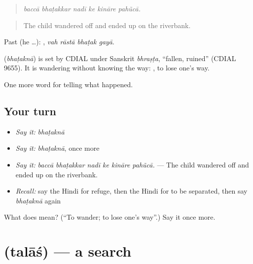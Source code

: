 \begin{quote}
     
\end{quote}

\begin{quote}
\emph{baccā bhaṭakkar nadī ke kināre pahũcā.}
\end{quote}

\begin{quote}
The child wandered off and ended up on the riverbank.
\end{quote}

Past (he …):    , \emph{vah rāstā bhaṭak gayā}.

\begin{cousinweb}
\textbf{} (\emph{bhaṭaknā}) is set by CDIAL under Sanskrit \emph{bhraṣṭa}, \textquotedblleft{}fallen, ruined\textquotedblright{} (CDIAL 9655). It is wandering without knowing the way: \textbf{ }, to lose one's way.
\end{cousinweb}

\begin{grammarlens}[title={What you've built}]
One more word for telling what happened.
\end{grammarlens}

\subsection*{Your turn}
\begin{itemize}
\raggedright
  \item \emph{Say it:} \emph{bhaṭaknā}
  \item \emph{Say it:} \emph{bhaṭaknā}, once more
  \item \emph{Say it:} \emph{baccā bhaṭakkar nadī ke kināre pahũcā.} — The child wandered off and ended up on the riverbank.
  \item \emph{Recall:} say the Hindi for refuge, then the Hindi for to be separated, then say \emph{bhaṭaknā} again
\end{itemize}

\begin{tcolorbox}[breakable,colback=teal!4,colframe=teal!35!black,title={Before you move on}]
What does  mean? (\textquotedblleft{}To wander; to lose one's way\textquotedblright{}.) Say it once more.
\end{tcolorbox}
\section[\texorpdfstring{\hi{तलाश} (talāś)}{तलाश (talāś)}]{ (talāś) — a search}

